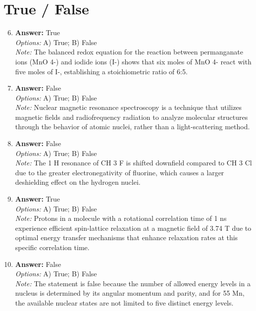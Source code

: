 \documentclass[12pt]{article}
\begin{document}
\section*{True / False}
\begin{enumerate}[label=\arabic*.]
\setcounter{enumi}{5}
\item \textbf{Answer:} True
\\ \textit{Options:} A) True; B) False
\\ \textit{Note:} The balanced redox equation for the reaction between permanganate ions (MnO 4-) and iodide ions (I-) shows that six moles of MnO 4- react with five moles of I-, establishing a stoichiometric ratio of 6:5.
\item \textbf{Answer:} False
\\ \textit{Options:} A) True; B) False
\\ \textit{Note:} Nuclear magnetic resonance spectroscopy is a technique that utilizes magnetic fields and radiofrequency radiation to analyze molecular structures through the behavior of atomic nuclei, rather than a light-scattering method.
\item \textbf{Answer:} False
\\ \textit{Options:} A) True; B) False
\\ \textit{Note:} The 1 H resonance of CH 3 F is shifted downfield compared to CH 3 Cl due to the greater electronegativity of fluorine, which causes a larger deshielding effect on the hydrogen nuclei.
\item \textbf{Answer:} True
\\ \textit{Options:} A) True; B) False
\\ \textit{Note:} Protons in a molecule with a rotational correlation time of 1 ns experience efficient spin-lattice relaxation at a magnetic field of 3.74 T due to optimal energy transfer mechanisms that enhance relaxation rates at this specific correlation time.
\item \textbf{Answer:} False
\\ \textit{Options:} A) True; B) False
\\ \textit{Note:} The statement is false because the number of allowed energy levels in a nucleus is determined by its angular momentum and parity, and for 55 Mn, the available nuclear states are not limited to five distinct energy levels.
\end{enumerate}
\end{document}
